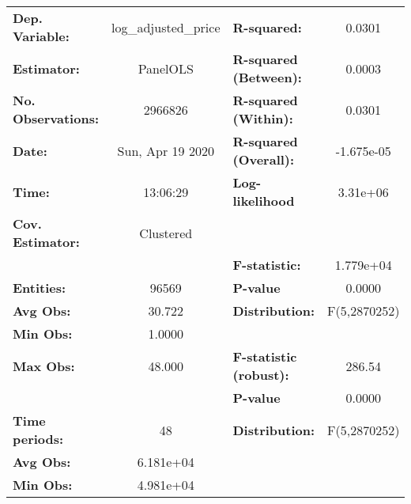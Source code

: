 \documentclass{report}
\begin{document}
\begin{center}
\begin{tabular}{lclc}
\toprule
\textbf{Dep. Variable:}                          & log\_adjusted\_price & \textbf{  R-squared:         }   &      0.0301      \\
\textbf{Estimator:}                              &       PanelOLS       & \textbf{  R-squared (Between):}  &      0.0003      \\
\textbf{No. Observations:}                       &       2966826        & \textbf{  R-squared (Within):}   &      0.0301      \\
\textbf{Date:}                                   &   Sun, Apr 19 2020   & \textbf{  R-squared (Overall):}  &    -1.675e-05    \\
\textbf{Time:}                                   &       13:06:29       & \textbf{  Log-likelihood     }   &     3.31e+06     \\
\textbf{Cov. Estimator:}                         &      Clustered       & \textbf{                     }   &                  \\
\textbf{}                                        &                      & \textbf{  F-statistic:       }   &    1.779e+04     \\
\textbf{Entities:}                               &        96569         & \textbf{  P-value            }   &      0.0000      \\
\textbf{Avg Obs:}                                &        30.722        & \textbf{  Distribution:      }   &   F(5,2870252)   \\
\textbf{Min Obs:}                                &        1.0000        & \textbf{                     }   &                  \\
\textbf{Max Obs:}                                &        48.000        & \textbf{  F-statistic (robust):} &      286.54      \\
\textbf{}                                        &                      & \textbf{  P-value            }   &      0.0000      \\
\textbf{Time periods:}                           &          48          & \textbf{  Distribution:      }   &   F(5,2870252)   \\
\textbf{Avg Obs:}                                &      6.181e+04       & \textbf{                     }   &                  \\
\textbf{Min Obs:}                                &      4.981e+04       & \textbf{                     }   &                  \\

\end{tabular}
\end{center}
\end{document}
